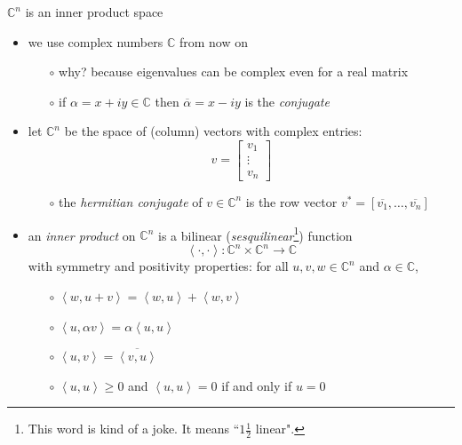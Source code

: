 \documentclass[10pt,hyperref]{beamer}
\newcommand{\CC}{\mathbb{C}}
\newcommand{\ip}[2]{\left<#1,#2\right>}
\begin{document}
\begin{frame}{$\CC^n$ is an inner product space}

\begin{itemize}
\item we use complex numbers $\CC$ from now on
    \begin{itemize}
    \item[$\circ$] why? because eigenvalues can be complex even for a real matrix
    \item[$\circ$] if $\alpha=x+iy \in \CC$ then $\overline{\alpha} = x-iy$ is the \emph{conjugate}
    \end{itemize}
\item let $\CC^n$ be the space of (column) vectors with complex entries:
\footnotesize
    $$v = \begin{bmatrix}
    v_1 \\ \vdots \\ v_n
    \end{bmatrix}$$
\normalsize
\vspace{-2mm}
    \begin{itemize}
    \item[$\circ$] the \emph{hermitian conjugate} of $v\in\CC^n$ is the row vector $v^* = [\overline{v_1},\dots,\overline{v_n}]$
    \end{itemize}
\item an \emph{inner product} on $\CC^n$ is a bilinear (\emph{sesquilinear}\footnote{This word is kind of a joke.  It means ``$1\frac{1}{2}$ linear".}) function
    $$\ip{\cdot}{\cdot}:\CC^n\times \CC^n \to \CC$$
with symmetry and positivity properties: \quad for all $u,v,w \in \CC^n$ and $\alpha\in \CC$,
    \begin{itemize}
    \item[$\circ$] $\ip{w}{u+v} = \ip{w}{u} + \ip{w}{v}$
    \item[$\circ$] $\ip{u}{\alpha v} = \alpha \ip{u}{u}$
    \item[$\circ$] $\ip{u}{v} = \overline{\ip{v}{u}}$
    \item[$\circ$] $\ip{u}{u} \ge 0$ and $\ip{u}{u}=0$ if and only if $u=0$
    \end{itemize}
\end{itemize}
\end{frame}
\end{document}
